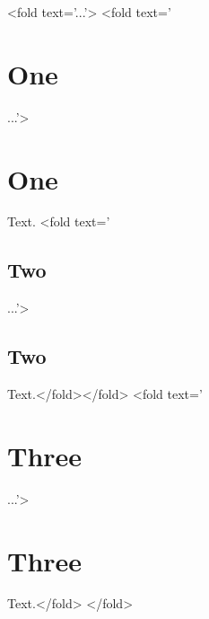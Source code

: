 <fold text='...'>
<fold text='\section{One}...'>\section{One}
Text.
<fold text='\subsection{Two}...'>\subsection{Two}
Text.</fold></fold>
<fold text='\section{Three}...'>\section{Three}
Text.</fold>
</fold>